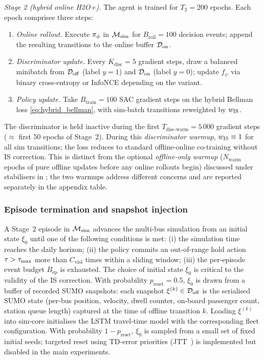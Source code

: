 \textit{Stage 2 (hybrid online H2O+).}
The agent is trained for $T_2 = 200$ epochs.
Each epoch comprises three steps:
\begin{enumerate}[leftmargin=2.0em, itemsep=2pt]
\item \textit{Online rollout.} Execute $\pi_\phi$ in $\mathcal{M}_{\mathrm{sim}}$ for $B_{\text{roll}} = 100$ decision events; append the resulting transitions to the online buffer $\mathcal{D}_{\mathrm{on}}$.
\item \textit{Discriminator update.} Every $K_{\text{disc}} = 5$ gradient steps, draw a balanced minibatch from $\mathcal{D}_{\mathrm{off}}$ (label $y = 1$) and $\mathcal{D}_{\mathrm{on}}$ (label $y = 0$); update $f_\psi$ via binary cross-entropy or InfoNCE depending on the variant.
\item \textit{Policy update.} Take $B_{\text{train}} = 100$ SAC gradient steps on the hybrid Bellman loss \eqref{eq:hybrid_bellman}, with sim-batch transitions reweighted by $w_{\mathrm{IS}}$.
\end{enumerate}
The discriminator is held inactive during the first $T_{\text{disc-warm}} = 5\,000$ gradient steps ($\approx$ first $50$ epochs of Stage~2).
During this \emph{discriminator warmup}, $w_{\mathrm{IS}} \equiv 1$ for all sim transitions; the loss reduces to standard offline-online co-training without IS correction.
This is distinct from the optional \emph{offline-only warmup} ($N_{\text{warm}}$ epochs of pure offline updates before any online rollouts begin) discussed under stabilisers in ; the two warmups address different concerns and are reported separately in the appendix table.

\subsubsection{Episode termination and snapshot injection}
\label{sec:method:reset}

A Stage~2 episode in $\mathcal{M}_{\mathrm{sim}}$ advances the multi-bus simulation from an initial state $\xi_0$ until one of the following conditions is met:
(i) the simulation time reaches the daily horizon;
(ii) the policy commits an out-of-range hold action $\tau > \tau_{\max}$ more than $C_{\text{viol}}$ times within a sliding window;
(iii) the per-episode event budget $B_{\text{ep}}$ is exhausted.
The choice of initial state $\xi_0$ is critical to the validity of the IS correction.
With probability $p_{\text{reset}} = 0.5$, $\xi_0$ is drawn from a buffer of recorded SUMO snapshots: each snapshot $\xi^{(k)} \in \mathcal{D}_{\mathrm{off}}$ is the serialised SUMO state (per-bus position, velocity, dwell counter, on-board passenger count, station queue length) captured at the time of offline transition $k$.
Loading $\xi^{(k)}$ into sim-core initialises the LSTM travel-time model with the corresponding fleet configuration.
With probability $1 - p_{\text{reset}}$, $\xi_0$ is sampled from a small set of fixed initial seeds; targeted reset using TD-error priorities (JTT~\citep{liu2021jtt}) is implemented but disabled in the main experiments.

